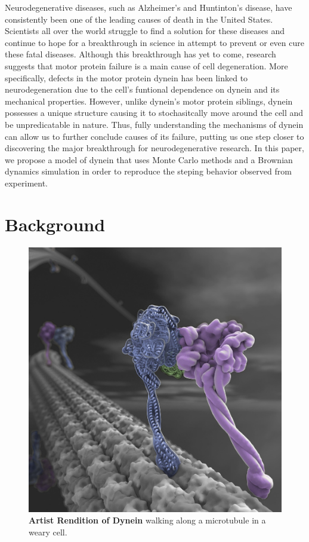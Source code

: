 
	Neurodegenerative diseases, such as Alzheimer's and Huntinton's disease, have consistently been one of the leading causes of death in the United States. Scientists all over the world struggle to find a solution for these diseases and continue to hope for a breakthrough in science in attempt to prevent or even cure these fatal diseases. Although this breakthrough has yet to come, research suggests that motor protein failure is a main cause of cell degeneration. More specifically, defects in the motor protein dynein has been linked to neurodegeneration due to the cell's funtional dependence on dynein and its mechanical properties. However, unlike dynein's motor protein siblings, dynein possesses a unique structure causing it to stochasitcally move around the cell and be unpredicatable in nature. Thus, fully understanding the mechanisms of dynein can allow us to further conclude causes of its failure, putting us one step closer to discovering the major breakthrough for neurodegenerative research. In this paper, we propose a model of dynein that uses Monte Carlo methods and a Brownian dynamics simulation in order to reproduce the steping behavior observed from experiment. 

\section{Background}

\begin{figure}[H]
	\centering
	\includegraphics[width=0.5\columnwidth]{Figures/dynein_walking_art.jpg}
	\caption[Artist Rendition of Dynein]{\textbf{Artist Rendition of Dynein} walking along a microtubule in a weary cell. \cite{JohnsonArt}}
	\label{fig:ArtDynein}
\end{figure}

